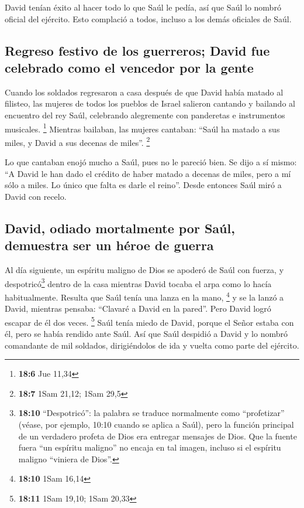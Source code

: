  David tenían éxito al hacer todo lo que Saúl le pedía,
así que Saúl lo nombró oficial del ejército. Esto complació a todos,
incluso a los demás oficiales de Saúl.

\hypertarget{regreso-festivo-de-los-guerreros-david-fue-celebrado-como-el-vencedor-por-la-gente}{%
\subsection{Regreso festivo de los guerreros; David fue celebrado como
el vencedor por la
gente}\label{regreso-festivo-de-los-guerreros-david-fue-celebrado-como-el-vencedor-por-la-gente}}

 Cuando los soldados regresaron a casa después de que
David había matado al filisteo, las mujeres de todos los pueblos de
Israel salieron cantando y bailando al encuentro del rey Saúl,
celebrando alegremente con panderetas e instrumentos musicales.
\footnote{\textbf{18:6} Jue 11,34}  Mientras bailaban, las
mujeres cantaban: ``Saúl ha matado a sus miles, y David a sus decenas de
miles''. \footnote{\textbf{18:7} 1Sam 21,12; 1Sam 29,5}

 Lo que cantaban enojó mucho a Saúl, pues no le pareció
bien. Se dijo a sí mismo: ``A David le han dado el crédito de haber
matado a decenas de miles, pero a mí sólo a miles. Lo único que falta es
darle el reino''.  Desde entonces Saúl miró a David con
recelo.

\hypertarget{david-odiado-mortalmente-por-sauxfal-demuestra-ser-un-huxe9roe-de-guerra}{%
\subsection{David, odiado mortalmente por Saúl, demuestra ser un héroe
de
guerra}\label{david-odiado-mortalmente-por-sauxfal-demuestra-ser-un-huxe9roe-de-guerra}}

 Al día siguiente, un espíritu maligno de Dios se apoderó
de Saúl con fuerza, y despotricó\footnote{\textbf{18:10} ``Despotricó'':
  la palabra se traduce normalmente como ``profetizar'' (véase, por
  ejemplo, 10:10 cuando se aplica a Saúl), pero la función principal de
  un verdadero profeta de Dios era entregar mensajes de Dios. Que la
  fuente fuera ``un espíritu maligno'' no encaja en tal imagen, incluso
  si el espíritu maligno ``viniera de Dios''.} dentro de la casa
mientras David tocaba el arpa como lo hacía habitualmente. Resulta que
Saúl tenía una lanza en la mano, \footnote{\textbf{18:10} 1Sam 16,14}
 y se la lanzó a David, mientras pensaba: ``Clavaré a
David en la pared''. Pero David logró escapar de él dos veces.
\footnote{\textbf{18:11} 1Sam 19,10; 1Sam 20,33}  Saúl
tenía miedo de David, porque el Señor estaba con él, pero se había
rendido ante Saúl.  Así que Saúl despidió a David y lo
nombró comandante de mil soldados, dirigiéndolos de ida y vuelta como
parte del ejército.

